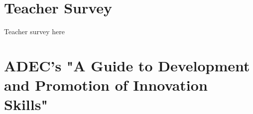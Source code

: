 \begin{appendices}
\section{Teacher Survey}
\label{appendix:teachersurvey}
Teacher survey here

\section{ADEC's "A Guide to Development and Promotion of Innovation Skills"}


\end{appendices}
